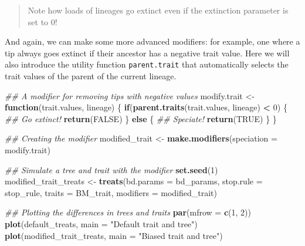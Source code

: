 \documentclass[
]{book}
\newenvironment{Shaded}{\begin{snugshade}}{\end{snugshade}}
\newcommand{\CommentTok}[1]{\textcolor[rgb]{0.56,0.35,0.01}{\textit{#1}}}
\newcommand{\ControlFlowTok}[1]{\textcolor[rgb]{0.13,0.29,0.53}{\textbf{#1}}}
\newcommand{\DataTypeTok}[1]{\textcolor[rgb]{0.13,0.29,0.53}{#1}}
\newcommand{\DecValTok}[1]{\textcolor[rgb]{0.00,0.00,0.81}{#1}}
\newcommand{\KeywordTok}[1]{\textcolor[rgb]{0.13,0.29,0.53}{\textbf{#1}}}
\newcommand{\NormalTok}[1]{#1}
\newcommand{\OperatorTok}[1]{\textcolor[rgb]{0.81,0.36,0.00}{\textbf{#1}}}
\newcommand{\OtherTok}[1]{\textcolor[rgb]{0.56,0.35,0.01}{#1}}
\newcommand{\StringTok}[1]{\textcolor[rgb]{0.31,0.60,0.02}{#1}}
\begin{document}
\begin{quote}
Note how loads of lineages go extinct even if the extinction parameter is set to 0!
\end{quote}

And again, we can make some more advanced modifiers: for example, one where a tip always goes extinct if their ancestor has a negative trait value. Here we will also introduce the utility function \texttt{parent.trait} that automatically selects the trait values of the parent of the current lineage.

\begin{Shaded}
\begin{Highlighting}[]
\CommentTok{\#\# A modifier for removing tips with negative values}
\NormalTok{modify.trait \textless{}{-}}\StringTok{ }\ControlFlowTok{function}\NormalTok{(trait.values, lineage) \{}
    \ControlFlowTok{if}\NormalTok{(}\KeywordTok{parent.traits}\NormalTok{(trait.values, lineage) }\OperatorTok{\textless{}}\StringTok{ }\DecValTok{0}\NormalTok{) \{}
        \CommentTok{\#\# Go extinct!}
        \KeywordTok{return}\NormalTok{(}\OtherTok{FALSE}\NormalTok{)}
\NormalTok{    \} }\ControlFlowTok{else}\NormalTok{ \{}
        \CommentTok{\#\# Speciate!}
        \KeywordTok{return}\NormalTok{(}\OtherTok{TRUE}\NormalTok{)}
\NormalTok{    \}}
\NormalTok{\}}

\CommentTok{\#\# Creating the modifier}
\NormalTok{modified\_trait \textless{}{-}}\StringTok{ }\KeywordTok{make.modifiers}\NormalTok{(}\DataTypeTok{speciation =}\NormalTok{ modify.trait)}

\CommentTok{\#\# Simulate a tree and trait with the modifier}
\KeywordTok{set.seed}\NormalTok{(}\DecValTok{1}\NormalTok{)}
\NormalTok{modified\_trait\_treats \textless{}{-}}\StringTok{ }\KeywordTok{treats}\NormalTok{(}\DataTypeTok{bd.params =}\NormalTok{ bd\_params,}
                                \DataTypeTok{stop.rule =}\NormalTok{ stop\_rule,}
                                \DataTypeTok{traits    =}\NormalTok{ BM\_trait,}
                                \DataTypeTok{modifiers =}\NormalTok{ modified\_trait)}

\CommentTok{\#\# Plotting the differences in trees and traits}
\KeywordTok{par}\NormalTok{(}\DataTypeTok{mfrow =} \KeywordTok{c}\NormalTok{(}\DecValTok{1}\NormalTok{, }\DecValTok{2}\NormalTok{))}
\KeywordTok{plot}\NormalTok{(default\_treats, }\DataTypeTok{main =} \StringTok{"Default trait and tree"}\NormalTok{)}
\KeywordTok{plot}\NormalTok{(modified\_trait\_treats, }\DataTypeTok{main =} \StringTok{"Biased trait and tree"}\NormalTok{)}
\end{Highlighting}
\end{Shaded}
\end{document}
